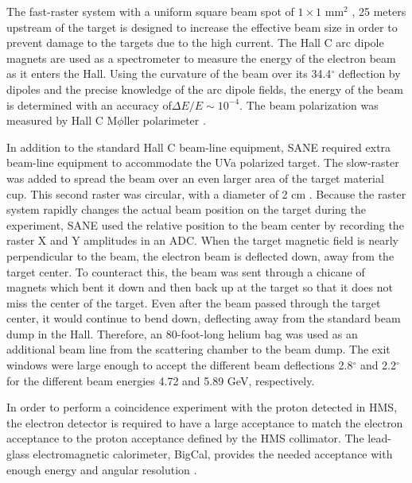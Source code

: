 \documentclass[12pt]{article}
\begin{document}
The fast-raster system with a uniform square beam spot of $1\times1$ mm$^2$ \cite{101, 102}, 25 meters upstream of the target is designed to increase the effective beam size in order to prevent damage to the targets due to the high current. 
The Hall C arc dipole magnets are used as a spectrometer to measure the energy of the electron beam as it enters the Hall. Using the curvature of the beam over its 34.4$^{\circ}$ deflection by dipoles and the precise knowledge of the arc dipole fields, the energy of the beam is determined with an accuracy of$\Delta E/E\sim 10^{-4}$. The beam polarization was measured by Hall C M$\phi$ller polarimeter \cite{104}.

In addition to the standard Hall C beam-line equipment, SANE required extra beam-line equipment to accommodate the UVa polarized target. The slow-raster was added to spread the beam over an even larger area of the target material cup. This second raster was circular, with a diameter of 2 cm \cite{105}. Because the raster system rapidly changes the actual beam position on the target during the experiment, SANE used the relative position to the beam center by recording the raster X and Y amplitudes in an ADC. When the target magnetic field is nearly perpendicular to the beam, the electron beam is deflected down, away from the target center. To counteract this, the beam was sent through a chicane of magnets which bent it down and then back up at the target so that it does not miss the center of the target. Even after the beam passed through the target center, it would continue to bend down, deflecting away from the standard beam dump in the Hall. Therefore, an 80-foot-long helium bag was used as an additional beam line from the scattering chamber to the beam dump. The exit windows were large enough to accept the different beam deflections 2.8$^{\circ}$ and 2.2$^{\circ}$ for the different beam energies 4.72 and 5.89 GeV, respectively.

In order to perform a coincidence experiment with the proton detected in HMS, the electron detector is required to have a large acceptance to match the electron acceptance to the proton acceptance defined by the HMS collimator. The lead-glass electromagnetic calorimeter, BigCal, provides the needed acceptance with enough energy and angular resolution \cite{106}.
\end{document}
